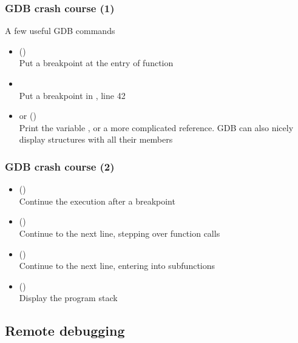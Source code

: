 \begin{frame}
  \frametitle{GDB crash course (1)}
  \small
  A few useful GDB commands
  \begin{itemize}
  \item {} ()\\
    Put a breakpoint at the entry of function 
  \item {}\\
    Put a breakpoint in , line 42
  \item {} or  ()\\
    Print the variable , or a more complicated reference. GDB
    can also nicely display structures with all their members
  \end{itemize}
\end{frame}

\begin{frame}
  \frametitle{GDB crash course (2)}
  \small
  \begin{itemize}
  \item {} ()\\
    Continue the execution after a breakpoint
  \item {} ()\\
    Continue to the next line, stepping over function calls
  \item {} ()\\
    Continue to the next line, entering into subfunctions
  \item {} ()\\
    Display the program stack
  \end{itemize}
\end{frame}

\subsection{Remote debugging}

